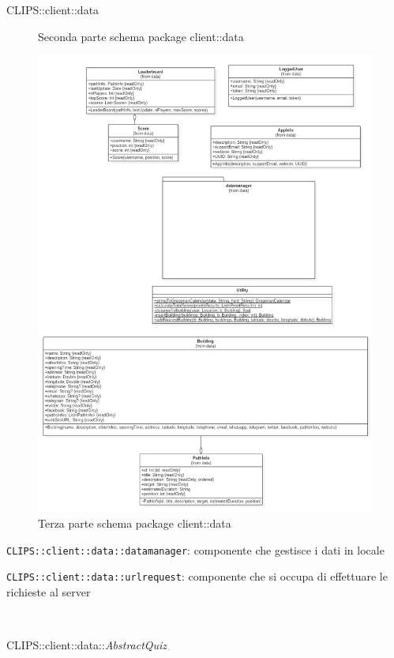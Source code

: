 \begin{componente}{CLIPS::client::data}
\begin{figure}[h!]
	\caption{Seconda parte schema package client::data}
\end{figure}
\begin{figure}[h!]
	\centering
	\includegraphics[scale=0.4]{img/package/png/client--data3.png}
	\caption{Terza parte schema package client::data}
\end{figure}
\begin{compPackageContenuti}
\item \texttt{CLIPS::client::data::datamanager}: componente che gestisce i dati in locale
\item \texttt{CLIPS::client::data::urlrequest}: componente che si occupa di effettuare le richieste al server
\end{compPackageContenuti}
\begin{compClassi} \\
\begin{classe}{CLIPS::client::data::\textit{AbstractQuiz}}

\end{classe}
\end{compClassi}
\end{componente}
